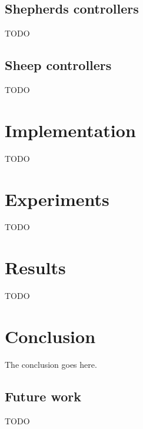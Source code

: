 \documentclass[conference]{IEEEtran}
\begin{document}
\subsection{Shepherds controllers}
TODO

\subsection{Sheep controllers}
TODO

\section{Implementation}
TODO

\section{Experiments}
TODO

\section{Results}
TODO

\section{Conclusion}
The conclusion goes here.

\subsection{Future work}
TODO





\end{document}
